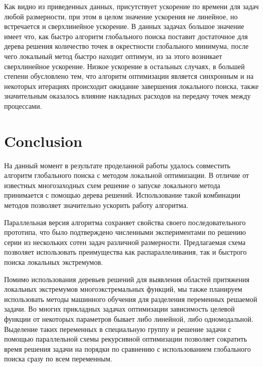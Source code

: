 \documentclass[runningheads]{llncs}
\begin{document}
Как видно из приведенных данных, присутствует ускорение по времени для задач любой размерности, при этом в целом значение ускорения не линейное, но встречается и сверхлинейное ускорение. В данных задачах большое значение имеет что, как быстро алгоритм глобального поиска поставит достаточное для дерева решения количество точек в окрестности глобального минимума, после чего локальный метод быстро находит оптимум, из за этого возникает сверхлинейное ускорение. Низкое ускорение в остальных случаях, в большей степени обусловлено тем, что алгоритм оптимизации является синхронным и на некоторых итерациях происходит ожидание завершения локального поиска, также значительным оказалось влияние накладных расходов на передачу точек между процессами. 









\section{Conclusion} 

На данный момент в результате проделанной работы удалось совместить алгоритм глобального поиска с методом локальной оптимизации. В отличие от известных многозаходных схем решение о запуске локального метода принимается с помощью дерева решений. Использование такой комбинации методов позволяет значительно ускорить работу алгоритма.

Параллельная версия алгоритма сохраняет свойства своего последовательного прототипа, что было подтверждено численными экспериментами по решению серии из нескольких сотен задач различной размерности. Предлагаемая схема позволяет использовать преимущества как распараллеливания, так и быстрого поиска локальных экстремумов.

Помимо использования деревьев решений для выявления областей притяжения локальных экстремумов многоэкстремальных функций, мы также планируем использовать методы машинного обучения для разделения переменных решаемой задачи. Во многих прикладных задачах оптимизации зависимость целевой функции от некоторых параметров бывает либо линейной, либо одномодальной. Выделение таких переменных в специальную группу и решение задачи с помощью параллельной схемы рекурсивной оптимизации \cite{Barkalov2020_1} позволяет сократить время решения задачи на порядки по сравнению с использованием глобального поиска сразу по всем переменным.
\end{document}
